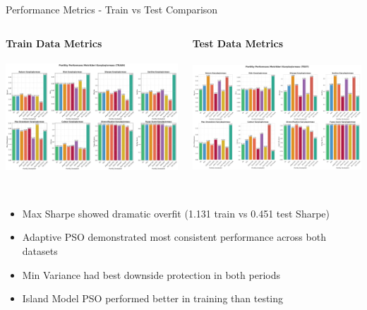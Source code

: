 \documentclass[aspectratio=169,xcolor=table]{beamer}
\begin{document}
\begin{frame}{Performance Metrics - Train vs Test Comparison}
  \begin{columns}
    \begin{column}{0.48\textwidth}
      \centering
      \textbf{Train Data Metrics}
      \includegraphics[width=\textwidth, height=5cm, keepaspectratio]{train_performance_metrics_comparison.png}
    \end{column}
    \begin{column}{0.48\textwidth}
      \centering
      \textbf{Test Data Metrics}
      \includegraphics[width=\textwidth, height=5cm, keepaspectratio]{test_performance_metrics_comparison.png}
    \end{column}
  \end{columns}
  
  \begin{tcolorbox}[
    enhanced,
    colback=blue!5,
    colframe=blue!70,
    arc=2mm,
    title=Train-Test Performance Analysis,
    fonttitle=\bfseries\large,
    boxrule=0.5mm
  ]
    \begin{itemize}
      \item Max Sharpe showed dramatic overfit (1.131 train vs 0.451 test Sharpe)
      \item Adaptive PSO demonstrated most consistent performance across both datasets
      \item Min Variance had best downside protection in both periods
      \item Island Model PSO performed better in training than testing
    \end{itemize}
  \end{tcolorbox}
\end{frame}
\end{document}
